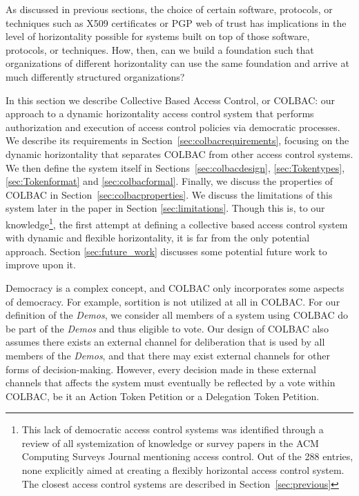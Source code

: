 As discussed in previous sections, the choice of certain software, protocols, or
techniques such as X509 certificates or PGP web of trust has implications in the
level of horizontality possible for systems built on top of those software,
protocols, or techniques. How, then, can we build a foundation such that
organizations of different horizontality can use the same foundation and arrive
at much differently structured organizations?

In this section we describe Collective Based Access Control, or COLBAC: our
approach to a dynamic horizontality access control system that performs
authorization and execution of access control policies via democratic processes.
We describe its requirements in Section~\ref{sec:colbacrequirements}, focusing
on the dynamic horizontality that separates COLBAC from other access control
systems. We then define the system itself in Sections~\ref{sec:colbacdesign},
\ref{sec:Tokentypes}, \ref{sec:Tokenformat} and \ref{sec:colbacformal}.
Finally, we discuss the properties of COLBAC in
Section~\ref{sec:colbacproperties}. We discuss the limitations of this system
later in the paper in Section \ref{sec:limitations}. Though this is, to our
knowledge\footnote{This lack of democratic access control systems was identified
through a review of all systemization of knowledge or survey papers in the ACM
Computing Surveys Journal mentioning access control. Out of the 288 entries,
none explicitly aimed at creating a flexibly horizontal access control system.
The closest access control systems are described in Section~\ref{sec:previous}},
the first attempt at defining a collective based access control system with
dynamic and flexible horizontality, it is far from the only potential approach.
Section \ref{sec:future_work} discusses some potential future work to improve
upon it.

Democracy is a complex concept, and COLBAC only incorporates some aspects of
democracy. For example, sortition is not utilized at all in COLBAC. For our
definition of the \textit{Demos}, we consider all members of a system using
COLBAC do be part of the \textit{Demos} and thus eligible to vote. Our design of
COLBAC also assumes there exists an external channel for deliberation that is
used by all members of the \textit{Demos}, and that there may exist external
channels for other forms of decision-making. However, every decision made in
these external channels that affects the system must eventually be reflected by
a vote within COLBAC, be it an Action Token Petition or a Delegation Token 
Petition.

